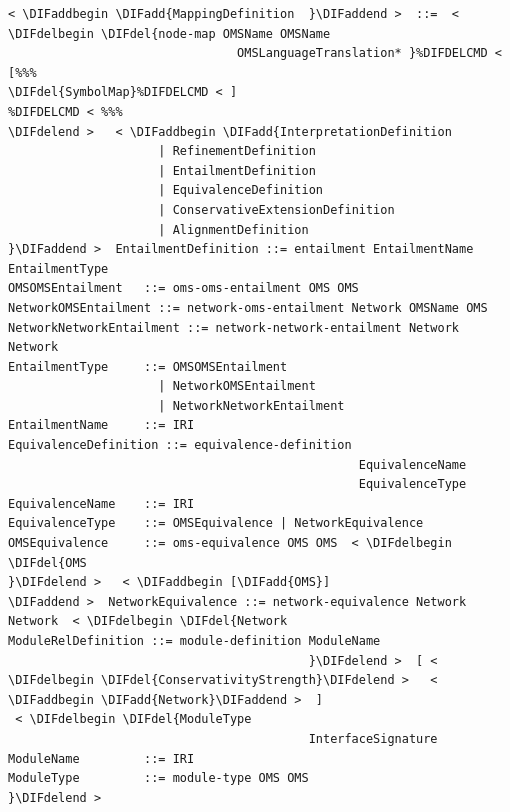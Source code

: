 \documentclass[10pt,fleqn,final]{scrreprt}
\providecommand{\DIFadd}[1]{{\protect\color{blue}\uwave{#1}}} %
\providecommand{\DIFdel}[1]{{\protect\color{red}\sout{#1}}}                      %
\providecommand{\DIFaddbegin}{} %
\providecommand{\DIFaddend}{} %
\providecommand{\DIFdelbegin}{} %
\providecommand{\DIFdelend}{} %
\begin{document}
\begin{lstlisting}[language=ebnf,escapeinside={<>},mathescape]  %DIF >  abstract syntax
< \DIFaddbegin \DIFadd{MappingDefinition  }\DIFaddend >  ::=  < \DIFdelbegin \DIFdel{node-map OMSName OMSName
                                OMSLanguageTranslation* }%DIFDELCMD < [%%%
\DIFdel{SymbolMap}%DIFDELCMD < ]
%DIFDELCMD < %%%
\DIFdelend >   < \DIFaddbegin \DIFadd{InterpretationDefinition
                     | RefinementDefinition
                     | EntailmentDefinition
                     | EquivalenceDefinition
                     | ConservativeExtensionDefinition
                     | AlignmentDefinition
}\DIFaddend >  EntailmentDefinition ::= entailment EntailmentName EntailmentType
OMSOMSEntailment   ::= oms-oms-entailment OMS OMS
NetworkOMSEntailment ::= network-oms-entailment Network OMSName OMS
NetworkNetworkEntailment ::= network-network-entailment Network Network
EntailmentType     ::= OMSOMSEntailment
                     | NetworkOMSEntailment
                     | NetworkNetworkEntailment
EntailmentName     ::= IRI
EquivalenceDefinition ::= equivalence-definition
                                                 EquivalenceName
                                                 EquivalenceType
EquivalenceName    ::= IRI
EquivalenceType    ::= OMSEquivalence | NetworkEquivalence
OMSEquivalence     ::= oms-equivalence OMS OMS  < \DIFdelbegin \DIFdel{OMS
}\DIFdelend >   < \DIFaddbegin [\DIFadd{OMS}]
\DIFaddend >  NetworkEquivalence ::= network-equivalence Network Network  < \DIFdelbegin \DIFdel{Network
ModuleRelDefinition ::= module-definition ModuleName
                                          }\DIFdelend >  [ < \DIFdelbegin \DIFdel{ConservativityStrength}\DIFdelend >   < \DIFaddbegin \DIFadd{Network}\DIFaddend >  ]
 < \DIFdelbegin \DIFdel{ModuleType
                                          InterfaceSignature
ModuleName         ::= IRI
ModuleType         ::= module-type OMS OMS
}\DIFdelend > \end{lstlisting}
\end{document}
